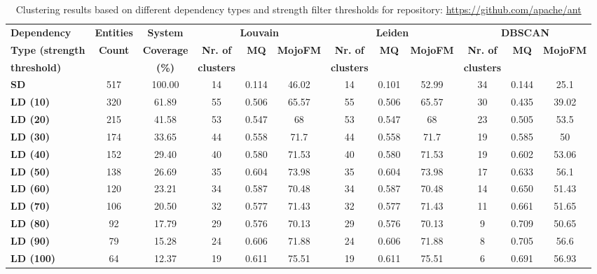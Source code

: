 \documentclass{ieeeaccess}
\begin{document}
\begin{table}[htbp]
\centering
\caption{Clustering results based on different dependency types and strength filter thresholds for repository: \url{https://github.com/apache/ant}}
\label{tab:clustering_results_ant}
\setlength{\tabcolsep}{7pt} 
\begin{tabular}{|l|c|c|ccc|ccc|ccc|}
\hline
 \textbf{Dependency} &  \textbf{Entities} & \textbf{System} & \multicolumn{3}{c|}{\textbf{Louvain}} & \multicolumn{3}{c|}{\textbf{Leiden}} & \multicolumn{3}{c|}{\textbf{DBSCAN}} \\
\cline{4-12}
\textbf{Type (strength } &  \textbf{Count} & \textbf{Coverage} & \textbf{Nr. of } & \textbf{MQ} & \textbf{MojoFM} & \textbf{Nr. of} & \textbf{MQ} & \textbf{MojoFM} & \textbf{Nr. of} & \textbf{MQ} & \textbf{MojoFM}  \\
\textbf{threshold)} &  & \textbf{(\%)} & \textbf{clusters} & & & \textbf{clusters} & &  & \textbf{clusters} & &\\
\hline
\rowcolor[HTML]{ECECEC} \textbf{SD} & 517 & 100.00 & 14 & 0.114 & 46.02 & 14 & 0.101 & 52.99 & 34 & 0.144 & 25.1  \\
\textbf{LD (10)} & 320 & 61.89 & 55 & 0.506 & 65.57 & 55 & 0.506 & 65.57 & 30 & 0.435 & 39.02 \\
\textbf{LD (20)} & 215 & 41.58 & 53 & 0.547 & 68 & 53 & 0.547 & 68 & 23 & 0.505 & 53.5 \\
\textbf{LD (30)} & 174 & 33.65 & 44 & 0.558 & 71.7 & 44 & 0.558 & 71.7 & 19 & 0.585 & 50 \\
\textbf{LD (40)} & 152 & 29.40 & 40 & 0.580 & 71.53 & 40 & 0.580 & 71.53 & 19 & 0.602 & 53.06 \\
\textbf{LD (50)} & 138 & 26.69 & 35 & 0.604 & 73.98 & 35 & 0.604 & 73.98 & 17 & 0.633 & 56.1 \\
\textbf{LD (60)} & 120 & 23.21 & 34 & 0.587 & 70.48 & 34 & 0.587 & 70.48 & 14 & 0.650 & 51.43 \\
\textbf{LD (70)} & 106 & 20.50 & 32 & 0.577 & 71.43 & 32 & 0.577 & 71.43 & 11 & 0.661 & 51.65 \\
\textbf{LD (80)} & 92 & 17.79 & 29 & 0.576 & 70.13 & 29 & 0.576 & 70.13 & 9 & \cellcolor[HTML]{FEF9E4}0.709 & 50.65 \\
\textbf{LD (90)} & 79 & 15.28 & 24 & 0.606 & 71.88 & 24 & 0.606 & 71.88 & 8 & 0.705 & 56.6 \\
\textbf{LD (100)} & 64 & 12.37 & 19 & \cellcolor[HTML]{fef9e4}0.611 & \cellcolor[HTML]{fef9e4}75.51 & 19 & \cellcolor[HTML]{fef9e4}0.611 & \cellcolor[HTML]{fef9e4}75.51 & 6 & 0.691 & \cellcolor[HTML]{fef9e4}56.93 \\

\end{tabular}
\end{table}
\end{document}

